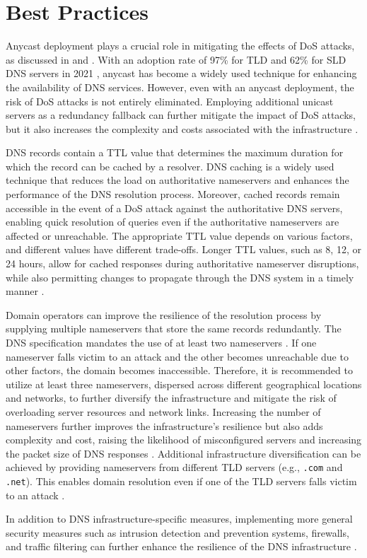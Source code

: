 \section{Best Practices} \label{sec:best_practices}
Anycast deployment plays a crucial role in mitigating the effects of DoS attacks, as discussed in  and .
With an adoption rate of 97\% for TLD and 62\% for SLD DNS servers in 2021 \cite{Sommese2021CharacterizationOA}, anycast has become a widely used technique for enhancing the availability of DNS services.
However, even with an anycast deployment, the risk of DoS attacks is not entirely eliminated.
Employing additional unicast servers as a redundancy fallback can further mitigate the impact of DoS attacks, but it also increases the complexity and costs associated with the infrastructure \cite{Sommese2021CharacterizationOA}.

DNS records contain a \acf{TTL} value that determines the maximum duration for which the record can be cached by a resolver.
DNS caching is a widely used technique that reduces the load on authoritative nameservers and enhances the performance of the DNS resolution process.
Moreover, cached records remain accessible in the event of a DoS attack against the authoritative DNS servers, enabling quick resolution of queries even if the authoritative nameservers are affected or unreachable.
The appropriate \ac{TTL} value depends on various factors, and different values have different trade-offs.
Longer \ac{TTL} values, such as 8, 12, or 24 hours, allow for cached responses during authoritative nameserver disruptions, while also permitting changes to propagate through the DNS system in a timely manner \cite{Moura2019CacheMI} \cite[140-141]{SommesePhD2023}.

Domain operators can improve the resilience of the resolution process by supplying multiple nameservers that store the same records redundantly.
The DNS specification mandates the use of at least two nameservers \cite{rfc1035}.
If one nameserver falls victim to an attack and the other becomes unreachable due to other factors, the domain becomes inaccessible.
Therefore, it is recommended to utilize at least three nameservers, dispersed across different geographical locations and networks, to further diversify the infrastructure and mitigate the risk of overloading server resources and network links.
Increasing the number of nameservers further improves the infrastructure's resilience but also adds complexity and cost, raising the likelihood of misconfigured servers and increasing the packet size of DNS responses \cite{rfc2182}.
Additional infrastructure diversification can be achieved by providing nameservers from different TLD servers (e.g., \texttt{.com} and \texttt{.net}). This enables domain resolution even if one of the TLD servers falls victim to an attack \cite[133-140]{SommesePhD2023}.

In addition to DNS infrastructure-specific measures, implementing more general security measures such as intrusion detection and prevention systems, firewalls, and traffic filtering can further enhance the resilience of the DNS infrastructure \cite[145-159]{bhattacharyya2016ddos}.